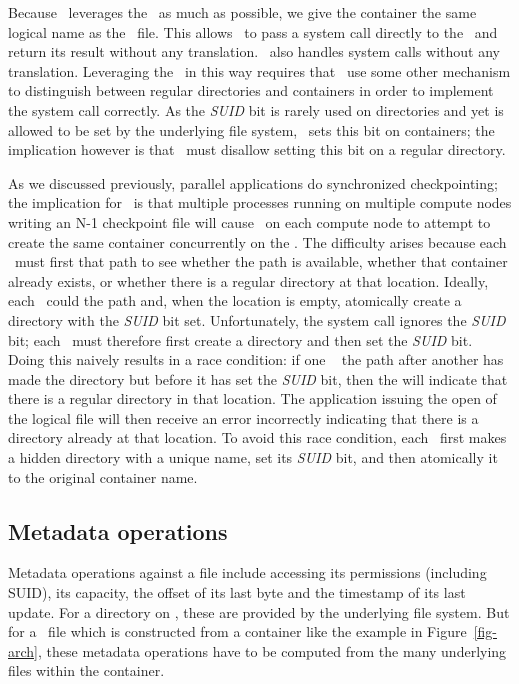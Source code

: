 Because \plfs\ leverages the \upfs\ as much as possible, we give the container
the same logical name as the \plfs\ file. This allows \plfs\ to pass a
 system call directly to the \upfs\ and return its result
without any translation.  \plfs\ also handles  system calls
without any translation.  Leveraging the \upfs\ in this way requires that
\plfs\ use some other mechanism to distinguish between regular directories and
containers in order to implement the  system call correctly. As
the \textit{SUID} bit is rarely used on directories and yet is allowed to be
set by the underlying file system, \plfs\ sets this bit on containers; the
implication however is that \plfs\ must disallow setting this bit on a regular
directory. 

As we discussed previously, parallel applications do synchronized
checkpointing; the implication for \plfs\ is that multiple processes running on
multiple compute nodes writing an N-1 checkpoint file will cause
\plfs\ on each compute node to attempt to create the same container
concurrently on the \upfs. The difficulty arises because each \plfs\ must first
 that path to see whether the path is available, whether that
container already exists, or whether there is a regular directory at that
location. Ideally, each \plfs\ could  the path and, when the
location is empty, atomically create a
directory with the \textit{SUID} bit set. Unfortunately, the 
system call ignores the \textit{SUID} bit; each \plfs\ must therefore first
create a directory and then set the \textit{SUID} bit. Doing this
naively results in a race condition: if one \plfs\  the path
after another has made the directory but before it has set the \textit{SUID}
bit, then the  will indicate that there is a regular directory in
that location. The application issuing the open of the logical file will then
receive an error incorrectly indicating that there is a directory already at
that location. To avoid this race condition, each \plfs\ first makes a
hidden directory with a unique name, set its \textit{SUID} bit, and then
atomically  it to the original container name.

\subsection{Metadata operations}
\label{arch-meta}

Metadata operations against a file include accessing its permissions (including
SUID), its capacity, the offset of its last byte and the timestamp of its last
update. For a directory on \plfs, these are provided by the underlying
file system. But for a \plfs\ file which is constructed from a container like
the example in Figure~\ref{fig-arch}, these metadata operations have to be
computed from the many underlying files within the container.


